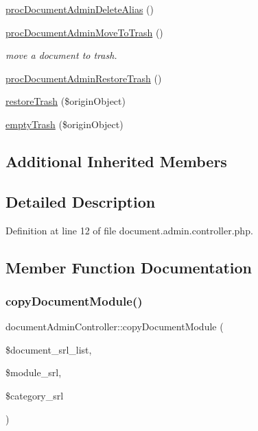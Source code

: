 \begin{DoxyCompactItemize}
\item 
\hyperlink{classdocumentAdminController_ab2f0c552145e0a56841e0aa7e8e03ae7}{proc\+Document\+Admin\+Delete\+Alias} ()
\item 
\hyperlink{classdocumentAdminController_a8dfa5d37621daaba6c66732eb3568730}{proc\+Document\+Admin\+Move\+To\+Trash} ()
\begin{DoxyCompactList}\small\item\em move a document to trash. \end{DoxyCompactList}\item 
\hyperlink{classdocumentAdminController_ac0467d27983d60c51c1128765244a36b}{proc\+Document\+Admin\+Restore\+Trash} ()
\item 
\hyperlink{classdocumentAdminController_a3750ffc8b40a8bbd46f5ac455e65cb37}{restore\+Trash} (\$origin\+Object)
\item 
\hyperlink{classdocumentAdminController_a52981a3af3d6b94661444f65568343ca}{empty\+Trash} (\$origin\+Object)
\end{DoxyCompactItemize}
\subsection*{Additional Inherited Members}


\subsection{Detailed Description}


Definition at line 12 of file document.\+admin.\+controller.\+php.



\subsection{Member Function Documentation}
\hypertarget{classdocumentAdminController_a9133d1466cbf4baae410f180f8b04e34}{}\label{classdocumentAdminController_a9133d1466cbf4baae410f180f8b04e34} 
\subsubsection{\texorpdfstring{copy\+Document\+Module()}{copyDocumentModule()}}
{\footnotesize\ttfamily document\+Admin\+Controller\+::copy\+Document\+Module (\begin{DoxyParamCaption}\item[{}]{\$document\+\_\+srl\+\_\+list,  }\item[{}]{\$module\+\_\+srl,  }\item[{}]{\$category\+\_\+srl }\end{DoxyParamCaption})}

